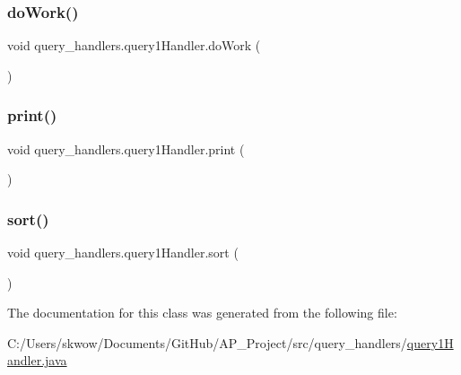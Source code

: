 \hypertarget{classquery__handlers_1_1query1_handler_a6e9b752a4ad27626e66dd07bd45661df}{}\label{classquery__handlers_1_1query1_handler_a6e9b752a4ad27626e66dd07bd45661df} 
\subsubsection{\texorpdfstring{do\+Work()}{doWork()}}
{\footnotesize\ttfamily void query\+\_\+handlers.\+query1\+Handler.\+do\+Work (\begin{DoxyParamCaption}{ }\end{DoxyParamCaption})}

\hypertarget{classquery__handlers_1_1query1_handler_adb0e49911128d6a1e710cace36a4fae0}{}\label{classquery__handlers_1_1query1_handler_adb0e49911128d6a1e710cace36a4fae0} 
\subsubsection{\texorpdfstring{print()}{print()}}
{\footnotesize\ttfamily void query\+\_\+handlers.\+query1\+Handler.\+print (\begin{DoxyParamCaption}{ }\end{DoxyParamCaption})}

\hypertarget{classquery__handlers_1_1query1_handler_ad31be63c673088813821cb1150c8506e}{}\label{classquery__handlers_1_1query1_handler_ad31be63c673088813821cb1150c8506e} 
\subsubsection{\texorpdfstring{sort()}{sort()}}
{\footnotesize\ttfamily void query\+\_\+handlers.\+query1\+Handler.\+sort (\begin{DoxyParamCaption}{ }\end{DoxyParamCaption})}



The documentation for this class was generated from the following file\+:\begin{DoxyCompactItemize}
\item 
C\+:/\+Users/skwow/\+Documents/\+Git\+Hub/\+A\+P\+\_\+\+Project/src/query\+\_\+handlers/\hyperlink{query1_handler_8java}{query1\+Handler.\+java}\end{DoxyCompactItemize}
